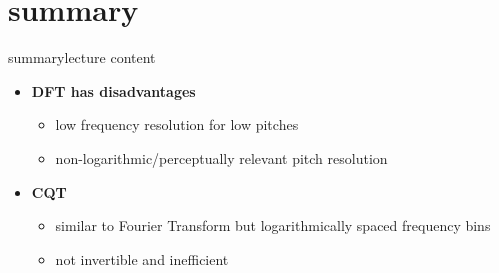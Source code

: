     \section{summary}
        \begin{frame}{summary}{lecture content}
            \begin{itemize}
                \item   \textbf{DFT has disadvantages}
                    \begin{itemize}
                        \item   low frequency resolution for low pitches
                        \item   non-logarithmic/perceptually relevant pitch resolution
                    \end{itemize}
                \bigskip
                \item      \textbf{CQT}
                    \begin{itemize}
                        \item   similar to Fourier Transform but logarithmically spaced frequency bins
                        \item   not invertible and inefficient
                    \end{itemize}
            \end{itemize}
        \end{frame}

